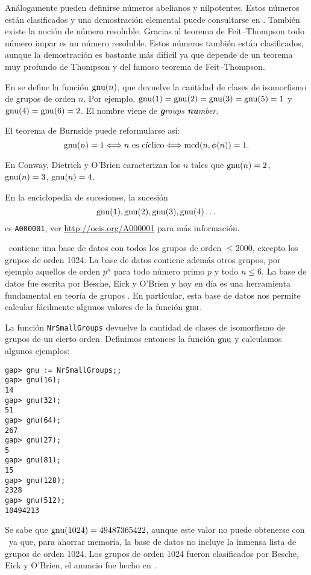 Análogamente pueden definirse números abelianos y nilpotentes. Estos números 
están clasificados y una demostración elemental puede consultarse en \cite{MR1786236}. 
También existe la noción de número resoluble. Gracias al teorema de Feit--Thompson 
todo número impar es un número resoluble. 
Estos números también están clasificados, aunque
la demostración es bastante más difícil ya que depende de un teorema muy profundo de Thompson y del 
famoso teorema de Feit--Thompson. 

\medskip
En \cite{MR2410121} se define la función $\operatorname{gnu}(n)$, que devuelve la cantidad de clases de isomorfismo 
de grupos de orden $n$. Por ejemplo, $\operatorname{gnu}(1)=\operatorname{gnu}(2)=\operatorname{gnu}(3)=\operatorname{gnu}(5)=1$ y $\operatorname{gnu}(4)=\operatorname{gnu}(6)=2$. 
El nombre viene de \emph{\textbf{g}roups \textbf{nu}mber}. 

El teorema de Burnside puede reformularse así: 
\[
\operatorname{gnu}(n)=1\Longleftrightarrow\text{$n$ es cíclico}\Longleftrightarrow\operatorname{mcd}(n,\phi(n))=1.
\]

En \cite{MR2410121} Conway, Dietrich y O'Brien caracterizan los $n$ tales que
$\operatorname{gnu}(n)=2$, $\operatorname{gnu}(n)=3$, $\operatorname{gnu}(n)=4$. 

En la enciclopedia de sucesiones, 
la sucesión 
\[
\operatorname{gnu}(1),\operatorname{gnu}(2),\operatorname{gnu}(3),\operatorname{gnu}(4)\dots
\]
es \lstinline{A000001}, ver \url{http://oeis.org/A000001} para más información. 

\GAP~contiene una base de datos con todos los grupos de orden $\leq2000$, excepto los 
grupos de orden 1024. La base de datos contiene además otros grupos, por ejemplo
aquellos de orden $p^n$ para todo número primo $p$ y todo $n\leq 6$. La base de datos
fue escrita por Besche, Eick y O'Brien y hoy en día es una herramienta fundamental 
en teoría de grupos \cite{MR1935567}. En particular, esta base de datos nos permite
calcular fácilmente algunos valores de la función $\operatorname{gnu}$. 

La función \lstinline{NrSmallGroups} devuelve la cantidad de clases de isomorfismo de grupos
de un cierto orden. Definimos entonces la función $\operatorname{gnu}$ y calculamos algunos ejemplos:

\begin{lstlisting}
gap> gnu := NrSmallGroups;;
gap> gnu(16);
14
gap> gnu(32);
51
gap> gnu(64);
267
gap> gnu(27);
5
gap> gnu(81);
15
gap> gnu(128);
2328
gap> gnu(512);
10494213
\end{lstlisting}

Se sabe que $\operatorname{gnu}(1024)=49487365422$, aunque este valor no puede obtenerse  
con \GAP~ya que, para ahorrar memoria, 
la base de datos no incluye la inmensa lista de grupos de orden 1024. Los grupos
de orden 1024 fueron clasificados por
Besche, Eick y O'Brien, el anuncio fue hecho en \cite{MR1826989}. 


